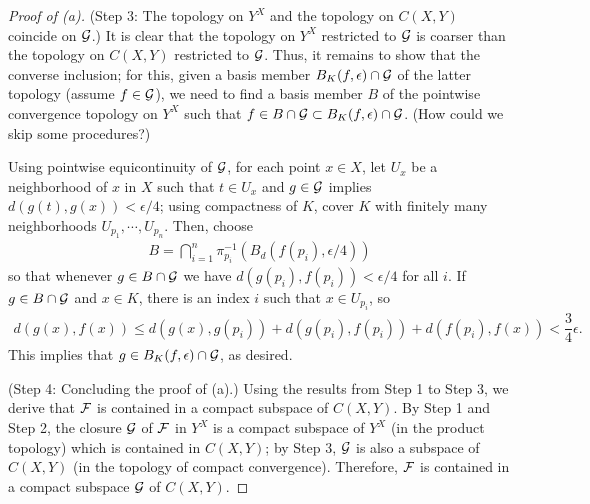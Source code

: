 \begin{proof}[Proof of (a)]
    \noindent(Step 3: The topology on $Y^X$ and the topology on $C(X, Y)$ coincide on ${\mathcal{G}}$.)\newline\indent
    It is clear that the topology on $Y^X$ restricted to ${\mathcal{G}}$ is coarser than the topology on $C(X, Y)$ restricted to ${\mathcal{G}}$.
    Thus, it remains to show that the converse inclusion; for this, given a basis member $B_K(f, \epsilon)\cap {\mathcal{G}}$ of the latter topology (assume $f\in{\mathcal{G}}$), we need to find a basis member $B$ of the pointwise convergence topology on $Y^X$ such that $f\in B\cap{\mathcal{G}}\subset B_K(f, \epsilon)\cap{\mathcal{G}}$. (How could we skip some procedures?)

    Using pointwise equicontinuity of ${\mathcal{G}}$, for each point $x\in X$, let $U_x$ be a neighborhood of $x$ in $X$ such that $t\in U_x$ and $g\in{\mathcal{G}}$ implies $d(g(t), g(x))<\epsilon/4$; using compactness of $K$, cover $K$ with finitely many neighborhoods $U_{p_1}, \cdots, U_{p_n}$.
    Then, choose
    \begin{align*}
        B=\bigcap_{i=1}^n \pi_{p_i}^{-1}(B_d(f(p_i), \epsilon/4))
    \end{align*}
    so that whenever $g\in B\cap{\mathcal{G}}$ we have $d(g(p_i), f(p_i))<\epsilon/4$ for all $i$.
    If $g\in B\cap{\mathcal{G}}$ and $x\in K$, there is an index $i$ such that $x\in U_{p_i}$, so
    \begin{align*}
        d(g(x), f(x))\leq d(g(x), g(p_i))+d(g(p_i), f(p_i))+d(f(p_i), f(x))<\dfrac{3}{4}\epsilon.
    \end{align*}
    This implies that $g\in B_K(f, \epsilon)\cap{\mathcal{G}}$, as desired.

    \noindent(Step 4: Concluding the proof of (a).)\newline\indent
    Using the results from Step 1 to Step 3, we derive that ${\mathcal{F}}$ is contained in a compact subspace of $C(X, Y)$.
    By Step 1 and Step 2, the closure ${\mathcal{G}}$ of ${\mathcal{F}}$ in $Y^X$ is a compact subspace of $Y^X$ (in the product topology) which is contained in $C(X, Y)$; by Step 3, ${\mathcal{G}}$ is also a subspace of $C(X, Y)$ (in the topology of compact convergence).
    Therefore, ${\mathcal{F}}$ is contained in a compact subspace ${\mathcal{G}}$ of $C(X, Y)$.
\end{proof}
